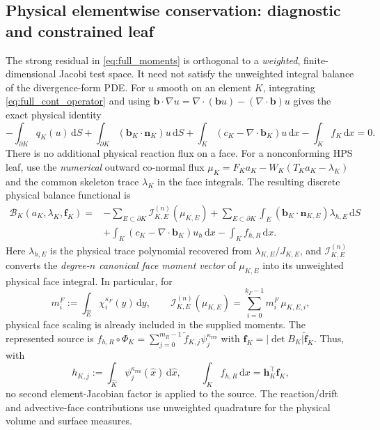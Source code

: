 \documentclass[11pt]{article}
\newcommand{\dd}{\mathrm d}
\begin{document}
\subsection{Physical elementwise conservation: diagnostic and constrained leaf}
\label{sec:full_balance}
The strong residual in \eqref{eq:full_moments} is orthogonal to a
\emph{weighted}, finite-dimensional Jacobi test space.  It need not
satisfy the unweighted integral balance of the divergence-form PDE.
For $u$ smooth on an element $K$, integrating
\eqref{eq:full_cont_operator} and using
$\bm b\cdot\nabla u=\nabla\cdot(\bm b u)-(\nabla\cdot\bm b)u$
gives the exact physical identity
\begin{equation}\label{eq:full_physical_balance}
 -\int_{\partial K}q_K(u)\,\dd S
 +\int_{\partial K}(\bm b_K\cdot\bm n_K)u\,\dd S
 +\int_K(c_K-\nabla\cdot\bm b_K)u\,\dd x
 -\int_K f_K\,\dd x=0.
\end{equation}
There is no additional physical reaction flux on a face.  For a
nonconforming HPS leaf, use the \emph{numerical} outward co-normal
flux $\mu_K=F_Ka_K-W_K(T_Ka_K-\lambda_K)$ and the common skeleton
trace $\lambda_K$ in the face integrals.  The resulting discrete
physical balance functional is
\begin{align}\label{eq:full_discrete_balance}
 \mathcal B_K(a_K,\lambda_K,\bm f_K)
 ={}&-\sum_{E\subset\partial K}\mathcal I_{K,E}^{(n)}
          (\mu_{K,E})
   +\sum_{E\subset\partial K}
          \int_E(\bm b_K\cdot\bm n_{K,E})\lambda_{h,E}\,\dd S
 \nonumber\\
 &+\int_K(c_K-\nabla\cdot\bm b_K)u_h\,\dd x
   -\int_K f_{h,R}\,\dd x.
\end{align}
Here $\lambda_{h,E}$ is the physical trace polynomial recovered from
$\lambda_{K,E}/J_{K,E}$, and
$\mathcal I_{K,E}^{(n)}$ converts the \emph{degree-$n$ canonical
face moment vector} of $\mu_{K,E}$ into its unweighted physical face
integral.  In particular, for
\begin{equation}\label{eq:full_mface}
 m^F_i:=\int_{\widehat E}\chi_i^{\kappa_F}(y)\,\dd y,
 \qquad
 \mathcal I_{K,E}^{(n)}(\mu_{K,E})
 =\sum_{i=0}^{k_F-1}m^F_i\,\mu_{K,E,i},
\end{equation}
physical face scaling is already included in the supplied moments.
The represented source is
$f_{h,R}\circ\Phi_K=\sum_{j=0}^{m_R-1}\widetilde f_{K,j}
\psi_j^{\kappa_{\mathrm{res}}}$ with
$\bm f_K=|\det B_K|\widetilde{\bm f}_K$.  Thus, with
\begin{equation}\label{eq:full_balance_h}
 h_{K,j}:=\int_{\widehat K}
      \psi_j^{\kappa_{\mathrm{res}}}(\widehat x)\,\dd\widehat x,
 \qquad \int_Kf_{h,R}\,\dd x=\bm h_K^\top\bm f_K,
\end{equation}
no second element-Jacobian factor is applied to the source.
The reaction/drift and advective-face contributions use unweighted
quadrature for the physical volume and surface measures.
\end{document}
